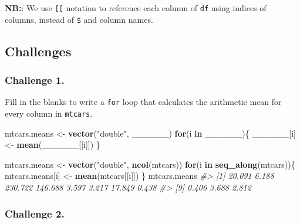 \documentclass[]{book}
\newenvironment{Shaded}{\begin{snugshade}}{\end{snugshade}}
\newcommand{\CommentTok}[1]{\textcolor[rgb]{0.56,0.35,0.01}{\textit{#1}}}
\newcommand{\ControlFlowTok}[1]{\textcolor[rgb]{0.13,0.29,0.53}{\textbf{#1}}}
\newcommand{\KeywordTok}[1]{\textcolor[rgb]{0.13,0.29,0.53}{\textbf{#1}}}
\newcommand{\NormalTok}[1]{#1}
\newcommand{\StringTok}[1]{\textcolor[rgb]{0.31,0.60,0.02}{#1}}
\begin{document}
\textbf{NB:}: We use \texttt{{[}{[}} notation to reference each column of \texttt{df} using indices of columns, instead of \texttt{\$} and column names.

\hypertarget{challenges-22}{%
\subsection{Challenges}\label{challenges-22}}

\hypertarget{challenge-1.-11}{%
\subsubsection*{Challenge 1.}\label{challenge-1.-11}}

Fill in the blanks to write a \texttt{for} loop that calculates the arithmetic mean for every column in \texttt{mtcars}.

\begin{Shaded}
\begin{Highlighting}[]
\NormalTok{mtcars.means <-}\StringTok{ }\KeywordTok{vector}\NormalTok{(}\StringTok{"double"}\NormalTok{, ______)}
\ControlFlowTok{for}\NormalTok{(i }\ControlFlowTok{in}\NormalTok{ ______)\{}
\NormalTok{  ______[i] <-}\StringTok{ }\KeywordTok{mean}\NormalTok{(______[[i]])}
\NormalTok{\}}
\end{Highlighting}
\end{Shaded}

\begin{Shaded}
\begin{Highlighting}[]
\NormalTok{mtcars.means <-}\StringTok{ }\KeywordTok{vector}\NormalTok{(}\StringTok{"double"}\NormalTok{, }\KeywordTok{ncol}\NormalTok{(mtcars))}
\ControlFlowTok{for}\NormalTok{(i }\ControlFlowTok{in} \KeywordTok{seq_along}\NormalTok{(mtcars))\{}
\NormalTok{  mtcars.means[i] <-}\StringTok{ }\KeywordTok{mean}\NormalTok{(mtcars[[i]])}
\NormalTok{\}}
\NormalTok{mtcars.means}
\CommentTok{#>  [1]  20.091   6.188 230.722 146.688   3.597   3.217  17.849   0.438}
\CommentTok{#>  [9]   0.406   3.688   2.812}
\end{Highlighting}
\end{Shaded}

\hypertarget{challenge-2.-11}{%
\subsubsection*{Challenge 2.}\label{challenge-2.-11}}
\end{document}
